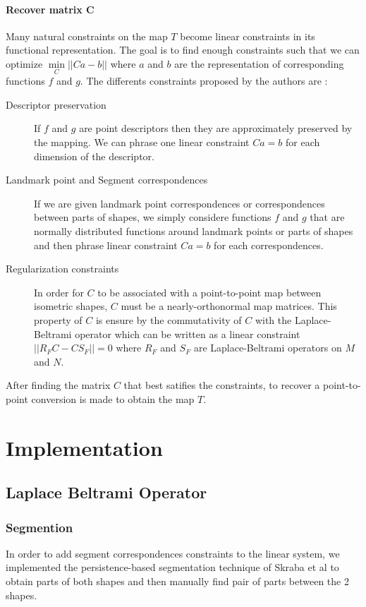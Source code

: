 \documentclass[10pt,twocolumn,letterpaper]{article}
\begin{document}
\paragraph{Recover matrix C} 
Many natural constraints on the map $T$ become linear constraints in its functional representation. The goal is to find enough constraints such that we can optimize $\underset{C}{\min}||Ca-b||$ where $a$ and $b$ are the representation of corresponding functions $f$ and $g$. The differents constraints proposed by the authors are : 
\begin{description}
\item[Descriptor preservation] If $f$ and $g$ are point descriptors then they are approximately preserved by the mapping. We can phrase one linear constraint $Ca=b$ for each dimension of the descriptor.
\item[Landmark point and Segment correspondences] If we are given landmark point correspondences or correspondences between parts of shapes, we simply considere functions $f$ and $g$ that are normally distributed functions around landmark points or parts of shapes and then phrase linear constraint $Ca=b$ for each correspondences.
\item[Regularization constraints] In order for $C$ to be associated with a point-to-point map between isometric shapes, $C$ must be a nearly-orthonormal map matrices. This property of $C$ is ensure by the commutativity of $C$ with the Laplace-Beltrami operator which can be written as a linear constraint $||R_FC-CS_F||=0$ where $R_F$ and $S_F$ are Laplace-Beltrami operators on $M$ and $N$.
\end{description}

After finding the matrix $C$ that best satifies the constraints, to recover a point-to-point conversion is made to obtain the map $T$.

\section{Implementation}
\subsection{Laplace Beltrami Operator}
\subsubsection*{Segmention} %
In order to add segment correspondences constraints to the linear system, we implemented the persistence-based segmentation technique of Skraba et al to obtain parts of both shapes and then manually find pair of parts between the 2 shapes.
\end{document}

